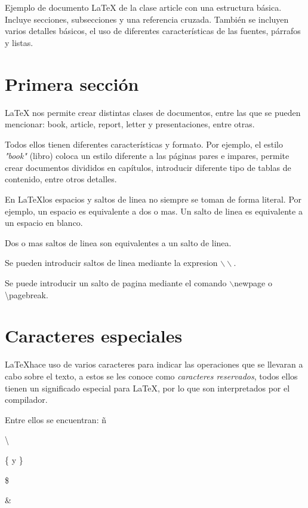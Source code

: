 \documentclass[letterpaper,11pt]{article}
\begin{document}
Ejemplo de documento \LaTeX{} de la clase {\ttfamily article} con una estructura b\'asica. 
Incluye secciones, subsecciones y una referencia cruzada. Tambi\'en se incluyen varios 
detalles b\'asicos, el uso de diferentes caracter\'isticas de las fuentes, p\'arrafos y listas.

\section{Primera secci\'on}\label{primera}

\LaTeX{} nos permite crear distintas clases de documentos, entre las que se pueden mencionar: 
book, article, report, letter y presentaciones, entre otras.

Todos ellos tienen diferentes caracter\'isticas y formato. Por ejemplo, el estilo \textit{"book"} 
(libro) coloca un estilo diferente a las p\'aginas pares e impares, permite crear documentos 
divididos en cap\'itulos, introducir diferente  tipo de tablas de contenido, entre otros detalles.





En \LaTeX los espacios y saltos de linea no siempre se toman de forma literal.
Por ejemplo, un espacio        es      equivalente a      dos o mas. 
Un salto de linea es equivalente a un espacio en blanco.

Dos o mas saltos de linea son equivalentes a un salto de linea.

Se pueden introducir saltos de linea mediante la expresion $\backslash\backslash$.

Se puede introducir un salto de pagina mediante el comando $\backslash$newpage o \textbackslash pagebreak.

\section{Caracteres especiales}

\LaTeX hace uso de varios caracteres para indicar las operaciones que se llevaran a cabo sobre el texto, a estos se les conoce como \emph{caracteres reservados}, todos ellos tienen un significado especial para \LaTeX, por lo que son interpretados por el compilador.

Entre ellos se encuentran: \~n

\textbackslash

\{ y \}

\$

\&
\end{document}
